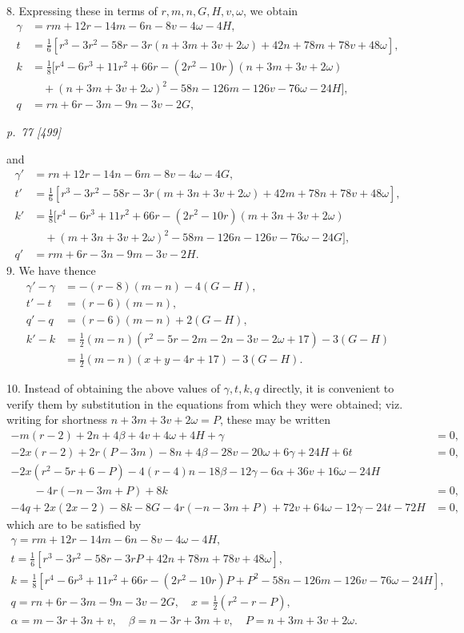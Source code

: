 \documentclass[11pt,a4paper]{article}
\newcommand{\pagemarker}[2]{\clearpage\noindent\textit{p.~#1 [#2]}\par\medskip}
\newcommand{\half}{\tfrac{1}{2}}
\begin{document}
8. Expressing these in terms of \(r,m,n,G,H,v,\omega\), we obtain
\begingroup\scriptsize
\[
\begin{aligned}
\gamma&=rm+12r-14m-6n-8v-4\omega-4H,\\
t&=\tfrac16[r^3-3r^2-58r-3r(n+3m+3v+2\omega)
+42n+78m+78v+48\omega],\\
k&=\tfrac18[r^4-6r^3+11r^2+66r-(2r^2-10r)(n+3m+3v+2\omega)\\
&\quad +(n+3m+3v+2\omega)^2-58n-126m-126v-76\omega-24H],\\
q&=rn+6r-3m-9n-3v-2G,
\end{aligned}
\]
\endgroup

\pagemarker{77}{499}
and
\begingroup\scriptsize
\[
\begin{aligned}
\gamma'&=rn+12r-14n-6m-8v-4\omega-4G,\\
t'&=\tfrac16[r^3-3r^2-58r-3r(m+3n+3v+2\omega)
+42m+78n+78v+48\omega],\\
k'&=\tfrac18[r^4-6r^3+11r^2+66r-(2r^2-10r)(m+3n+3v+2\omega)\\
&\quad +(m+3n+3v+2\omega)^2-58m-126n-126v-76\omega-24G],\\
q'&=rm+6r-3n-9m-3v-2H.
\end{aligned}
\]
\endgroup
9. We have thence
\[
\begin{aligned}
\gamma'-\gamma&=-(r-8)(m-n)-4(G-H),\\
t'-t&=(r-6)(m-n),\\
q'-q&=(r-6)(m-n)+2(G-H),\\
k'-k&=\half(m-n)(r^2-5r-2m-2n-3v-2\omega+17)-3(G-H)\\
&=\half(m-n)(x+y-4r+17)-3(G-H).
\end{aligned}
\]

10. Instead of obtaining the above values of \(\gamma,t,k,q\) directly, it is convenient
to verify them by substitution in the equations from which they were obtained; viz.
writing for shortness \(n+3m+3v+2\omega=P\), these may be written
\begingroup\scriptsize
\[
\begin{aligned}
-m(r-2)+2n+4\beta+4v+4\omega+4H+\gamma&=0,\\
-2x(r-2)+2r(P-3m)-8n+4\beta-28v-20\omega+6\gamma+24H+6t&=0,\\
-2x(r^2-5r+6-P)-4(r-4)n-18\beta-12\gamma-6\alpha
+36v+16\omega-24H\\
\qquad{}-4r(-n-3m+P)+8k&=0,\\
-4q+2x(2x-2)-8k-8G-4r(-n-3m+P)+72v+64\omega
-12\gamma-24t-72H&=0,
\end{aligned}
\]
\endgroup
which are to be satisfied by
\begingroup\scriptsize
\[
\begin{gathered}
\gamma=rm+12r-14m-6n-8v-4\omega-4H,\\
t=\tfrac16[r^3-3r^2-58r-3rP+42n+78m+78v+48\omega],\\
k=\tfrac18[r^4-6r^3+11r^2+66r-(2r^2-10r)P+P^2
-58n-126m-126v-76\omega-24H],\\
q=rn+6r-3m-9n-3v-2G,\quad
x=\half(r^2-r-P),\\
\alpha=m-3r+3n+v,\quad \beta=n-3r+3m+v,\quad
P=n+3m+3v+2\omega.
\end{gathered}
\]
\endgroup
\end{document}

